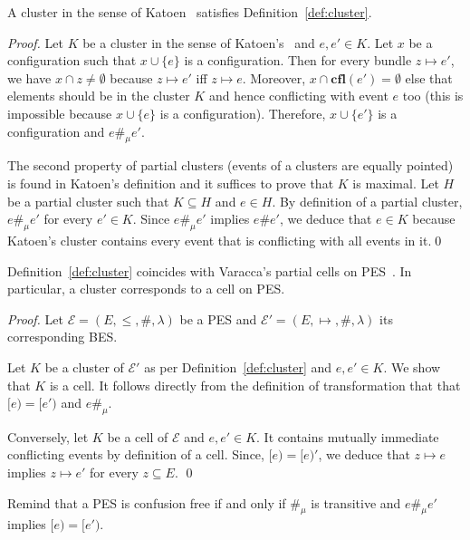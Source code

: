 \documentclass{llncs}
\newcommand{\EE}{\mathcal{E}}
\newcommand{\cfl}{\mathbf{cfl}}
\newcommand{\<}{\langle}
\renewcommand{\>}{\rangle}
\begin{document}
\begin{proposition}
A cluster in the sense of Katoen~\cite{Kat96} satisfies Definition~\ref{def:cluster}.
\end{proposition}

\begin{proof}
Let $K$ be a cluster in the sense of Katoen's~\cite{Kat96} and $e,e'\in K$. Let $x$ be a configuration such that $x\cup\{e\}$ is a configuration. Then for every bundle $z\mapsto e'$, we have $x\cap z\neq \emptyset$ because $z\mapsto e'$ iff $z\mapsto e$. Moreover, $x\cap\cfl(e')=\emptyset$ else that elements should be in the cluster $K$ and hence conflicting with event $e$ too (this is impossible because $x\cup\{e\}$ is a configuration). Therefore, $x\cup\{e'\}$ is a configuration and $e\#_\mu e'$. 

The second property of partial clusters (events of a clusters are equally pointed) is found in Katoen's definition and it suffices to prove that $K$ is maximal. Let $H$ be a partial cluster such that $K\subseteq H$ and $e\in H$. By definition of a partial cluster, $e\#_\mu e'$ for every $e'\in K$. Since $e\#_\mu e'$ implies $e\#e'$, we deduce that $e\in K$ because Katoen's cluster contains every event that is conflicting with all events in it.\qed
\end{proof}




\begin{proposition}\label{pro:cluster-cell}
Definition~\ref{def:cluster} coincides with Varacca's partial cells on PES~\cite{Var03}. In particular, a cluster corresponds to a cell on PES.
\end{proposition}

\begin{proof}
Let $\EE = (E,\leq,\#,\lambda)$ be a PES and $\EE' = (E,\mapsto,\#,\lambda)$ its corresponding BES. 

Let $K$ be a cluster of $\EE'$ as per Definition~\ref{def:cluster} and $e,e'\in K$. We show that $K$ is a cell. It follows directly from the definition of transformation that that $[e)=[e')$ and $e\#_\mu$. 

Conversely, let $K$ be a cell of $\EE$ and $e,e'\in K$. It contains mutually immediate conflicting events by definition of a cell. Since, $[e) = [e)'$, we deduce that $z\mapsto e$ implies $z\mapsto e'$ for every $z\subseteq E$. \qed
\end{proof}

Remind that a PES is confusion free if and only if $\#_\mu$ is transitive and $e\#_{\mu}e'$ implies $[e)=[e')$.
\end{document}
